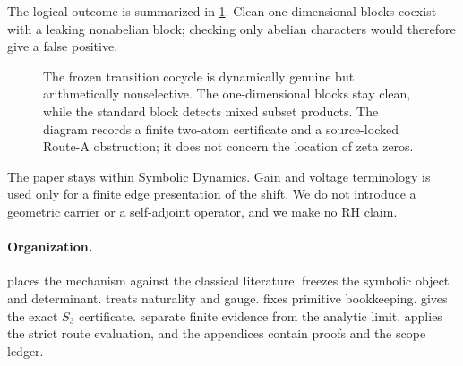The logical outcome is summarized in \cref{fig:no-go}.  Clean
one-dimensional blocks coexist with a leaking nonabelian block; checking
only abelian characters would therefore give a false positive.

\begin{figure}[t]
\centering
\resizebox{\textwidth}{!}{}
\caption{The frozen transition cocycle is dynamically genuine but
arithmetically nonselective.  The one-dimensional blocks stay clean, while
the standard block detects mixed subset products.  The diagram records a
finite two-atom certificate and a source-locked Route-A obstruction; it does
not concern the location of zeta zeros.}
\label{fig:no-go}
\end{figure}

The paper stays within Symbolic Dynamics.  Gain and voltage terminology is
used only for a finite edge presentation of the shift.  We do not introduce
a geometric carrier or a self-adjoint operator, and we make no RH claim.

\paragraph{Organization.}
 places the mechanism against the classical literature.
 freezes the symbolic object and determinant.
 treats naturality and gauge.
 fixes primitive bookkeeping.
 gives the exact $S_3$ certificate.
 separate finite evidence from the analytic
limit.   applies the strict route evaluation, and the
appendices contain proofs and the scope ledger.
